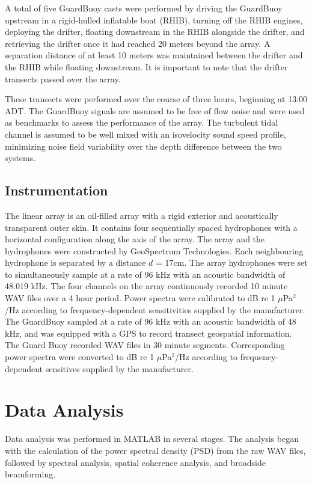 \documentclass[12pt,journal,onecolumn]{IEEEtran}
\begin{document}
A total of five GuardBuoy casts were performed by driving the GuardBuoy upstream in a rigid-hulled inflatable boat (RHIB), turning off the RHIB engines, deploying the drifter, floating downstream in the RHIB alongside the drifter, and retrieving the drifter once it had reached 20 meters beyond the array. A separation distance of at least 10 meters was maintained between the drifter and the RHIB while floating downstream. It is important to note that the drifter transects passed over the array. 

These transects were performed over the course of three hours, beginning at 13:00 ADT. The GuardBuoy signals are assumed to be free of flow noise and were used as benchmarks to assess the performance of the array. The turbulent tidal channel is assumed to be well mixed with an isovelocity sound speed profile, minimizing noise field variability over the depth difference between the two systems.



\subsection{Instrumentation}
The linear array is an oil-filled array with a rigid exterior and acoustically transparent outer skin. It contains four sequentially spaced hydrophones with a horizontal configuration along the axis of the array. The array and the hydrophones were constructed by GeoSpectrum Technologies. Each neighbouring hydrophone is separated by a distance $d$ = 17cm. The array hydrophones were set to simultaneously sample at a rate of 96 kHz with an acoustic bandwidth of 48.019 kHz.
The four channels on the array continuously recorded 10 minute WAV files over a 4 hour period. Power spectra were calibrated to dB re 1 $\mu$Pa$^2$/Hz according to frequency-dependent sensitivities supplied by the manufacturer. The GuardBuoy sampled at a rate of 96 kHz with an acoustic bandwidth of 48 kHz, and was equipped with a GPS to record transect geospatial information. The Guard Buoy recorded WAV files in 30 minute segments. Corresponding power spectra were converted to dB re 1 $\mu$Pa$^2$/Hz according to frequency-dependent sensitives supplied by the manufacturer. 







\section{Data Analysis}
\label{III}
Data analysis was performed in MATLAB in several stages. The analysis began with the calculation of the power spectral density (PSD) from the raw WAV files, followed by spectral analysis, spatial coherence analysis, and broadside beamforming. 
\end{document}
